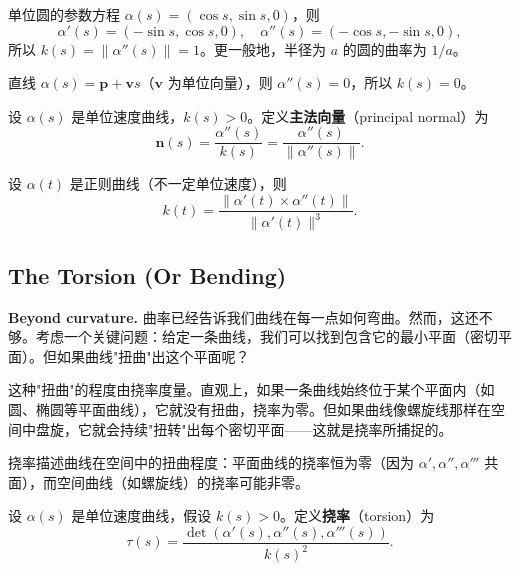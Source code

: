 \begin{Example}[圆的曲率]\label{ex:circle-curvature-ch1}
单位圆的参数方程 $\alpha(s) = (\cos s, \sin s, 0)$，则
\[
\alpha'(s) = (-\sin s, \cos s, 0),\quad \alpha''(s) = (-\cos s, -\sin s, 0),
\]
所以 $k(s) = \|\alpha''(s)\| = 1$。更一般地，半径为 $a$ 的圆的曲率为 $1/a$。
\end{Example}

\begin{Example}[直线的曲率]\label{ex:line-curvature-ch1}
直线 $\alpha(s) = \mathbf{p} + \mathbf{v}s$（$\mathbf{v}$ 为单位向量），则 $\alpha''(s) = 0$，所以 $k(s) = 0$。
\end{Example}

\begin{Definition}[主法向量]\label{def:principal-normal}
设 $\alpha(s)$ 是单位速度曲线，$k(s) > 0$。定义\textbf{主法向量}（principal normal）为
\[
\mathbf{n}(s) = \frac{\alpha''(s)}{k(s)} = \frac{\alpha''(s)}{\|\alpha''(s)\|}.
\]
\end{Definition}

\begin{Proposition}[曲率的另一个表达式]\label{prop:curvature-alternative}
设 $\alpha(t)$ 是正则曲线（不一定单位速度），则
\[
k(t) = \frac{\|\alpha'(t) \times \alpha''(t)\|}{\|\alpha'(t)\|^3}.
\]
\end{Proposition}

\subsection{The Torsion (Or Bending)}\label{sec:torsion}

\textbf{Beyond curvature.} 曲率已经告诉我们曲线在每一点如何弯曲。然而，这还不够。考虑一个关键问题：给定一条曲线，我们可以找到包含它的最小平面（密切平面）。但如果曲线"扭曲"出这个平面呢？

这种"扭曲"的程度由挠率度量。直观上，如果一条曲线始终位于某个平面内（如圆、椭圆等平面曲线），它就没有扭曲，挠率为零。但如果曲线像螺旋线那样在空间中盘旋，它就会持续"扭转"出每个密切平面——这就是挠率所捕捉的。

挠率描述曲线在空间中的扭曲程度：平面曲线的挠率恒为零（因为 $\alpha', \alpha'', \alpha'''$ 共面），而空间曲线（如螺旋线）的挠率可能非零。

\begin{Definition}[挠率]\label{def:torsion-ch1}
设 $\alpha(s)$ 是单位速度曲线，假设 $k(s) > 0$。定义\textbf{挠率}（torsion）为
\[
\tau(s) = \frac{\det(\alpha'(s), \alpha''(s), \alpha'''(s))}{k(s)^2}.
\]
\end{Definition}

